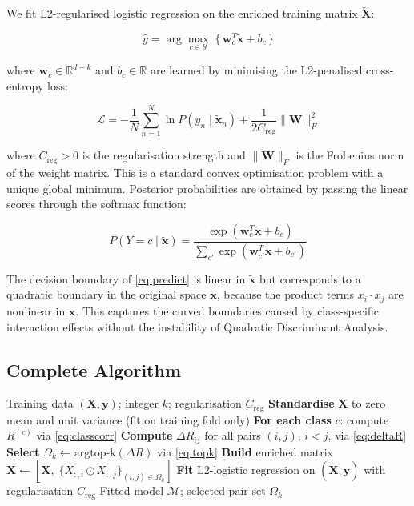 \documentclass[conference]{IEEEtran}
\begin{document}
We fit L2-regularised logistic regression on the enriched training matrix
$\tilde{\mathbf{X}}$:

\begin{equation}
\hat{y}
= \arg\max_{c \in \mathcal{Y}}\;
  \bigl\{\,
    \mathbf{w}_c^T \tilde{\mathbf{x}} + b_c
  \,\bigr\}
\label{eq:predict}
\end{equation}

\noindent where $\mathbf{w}_c \in \mathbb{R}^{d+k}$ and $b_c \in \mathbb{R}$
are learned by minimising the L2-penalised cross-entropy loss:

\begin{equation}
\mathcal{L}
= -\frac{1}{N}\sum_{n=1}^{N} \ln P(y_n \mid \tilde{\mathbf{x}}_n)
  + \frac{1}{2C_{\text{reg}}} \|\mathbf{W}\|_F^2
\label{eq:loss}
\end{equation}

\noindent where $C_{\text{reg}} > 0$ is the regularisation strength and
$\|\mathbf{W}\|_F$ is the Frobenius norm of the weight matrix.
This is a standard convex optimisation problem with a unique global minimum.
Posterior probabilities are obtained by passing the linear scores through
the softmax function:

\begin{equation}
P(Y{=}c \mid \tilde{\mathbf{x}})
= \frac{
    \exp(\mathbf{w}_c^T \tilde{\mathbf{x}} + b_c)
  }{
    \sum_{c'} \exp(\mathbf{w}_{c'}^T \tilde{\mathbf{x}} + b_{c'})
  }
\label{eq:softmax}
\end{equation}

The decision boundary of \eqref{eq:predict} is linear in $\tilde{\mathbf{x}}$
but corresponds to a quadratic boundary in the original space $\mathbf{x}$,
because the product terms $x_i \cdot x_j$ are nonlinear in $\mathbf{x}$.
This captures the curved boundaries caused by class-specific interaction
effects without the instability of Quadratic Discriminant Analysis.

\subsection{Complete Algorithm}

\begin{algorithm}[!t]
\caption{CS-LLN: Training}
\label{alg:train}
\begin{algorithmic}[1]
\REQUIRE Training data $(\mathbf{X}, \mathbf{y})$;
         integer $k$;
         regularisation $C_{\text{reg}}$
\STATE
  \textbf{Standardise} $\mathbf{X}$ to zero mean and unit variance
  (fit on training fold only)
\STATE
  \textbf{For each class} $c$: compute $R^{(c)}$ via \eqref{eq:classcorr}
\STATE
  \textbf{Compute} $\Delta R_{ij}$ for all pairs $(i,j)$, $i < j$,
  via \eqref{eq:deltaR}
\STATE
  \textbf{Select} $\Omega_k \leftarrow \mathrm{argtop\text{-}k}(\Delta R)$
  via \eqref{eq:topk}
\STATE
  \textbf{Build} enriched matrix
  $\tilde{\mathbf{X}} \leftarrow
   [\mathbf{X},\; \{X_{:,i} \odot X_{:,j}\}_{(i,j)\in\Omega_k}]$
\STATE
  \textbf{Fit} L2-logistic regression on $(\tilde{\mathbf{X}}, \mathbf{y})$
  with regularisation $C_{\text{reg}}$
\ENSURE Fitted model $\mathcal{M}$; selected pair set $\Omega_k$
\end{algorithmic}
\end{algorithm}
\end{document}
